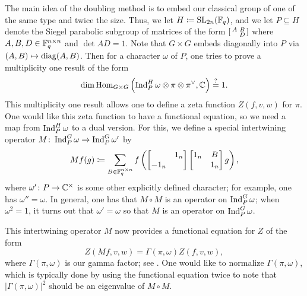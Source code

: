 \documentclass{amsart}
\begin{document}
The main idea of the doubling method is to embed our classical group of one of the same type and twice the size. Thus, we let $H\coloneqq\operatorname{SL}_{2n}(\mathbb F_q)$, and we let $P\subseteq H$ denote the Siegel parabolic subgroup of matrices of the form $\begin{bsmallmatrix}
    A & B \\ & D
\end{bsmallmatrix}$ where $A,B,D\in\mathbb F_q^{n\times n}$ and $\det AD=1$. %
Note that $G\times G$ embeds diagonally into $P$ via $(A,B)\mapsto\operatorname{diag}(A,B)$. %
Then for a character $\omega$ of $P$, one tries to prove a multiplicity one result of the form
\[\dim\operatorname{Hom}_{G\times G}\left(\operatorname{Ind}_P^H\omega\otimes\pi\otimes\pi^\lor,\mathbb C\right)\stackrel?=1.\]
This multiplicity one result allows one to define a zeta function $Z(f,v,w)$ for $\pi$. %
One would like this zeta function to have a functional equation, so we need a map from $\operatorname{Ind}_P^H\omega$ to a dual version. For this, we define a special intertwining operator $M\colon\operatorname{Ind}_P^G\omega\to\operatorname{Ind}_P^G\omega'$ by
\[Mf(g)\coloneqq\sum_{B\in\mathbb F_q^{n\times n}}f\left(\begin{bmatrix}
    & 1_n \\ -1_n
\end{bmatrix}\begin{bmatrix}
    1_n & B \\ & 1_n
\end{bmatrix}g\right),\]
where $\omega'\colon P\to\mathbb C^\times$ is some other explicitly defined character; for example, one has $\omega''=\omega$. In general, one has that $M\circ M$ is an operator on $\operatorname{Ind}_P^G\omega$; when $\omega^2=1$, it turns out that $\omega'=\omega$ so that $M$ is an operator on $\operatorname{Ind}_P^G\omega$.

This intertwining operator $M$ now provides a functional equation for $Z$ of the form
\[Z(Mf,v,w)=\Gamma(\pi,\omega)Z(f,v,w),\]
where $\Gamma(\pi,\omega)$ is our gamma factor; see \cite[Theorem~3.14]{chang-doubling}. One would like to normalize $\Gamma(\pi,\omega)$, which is typically done by using the functional equation twice to note that $\left|\Gamma(\pi,\omega)\right|^2$ should be an eigenvalue of $M\circ M$.
\end{document}
